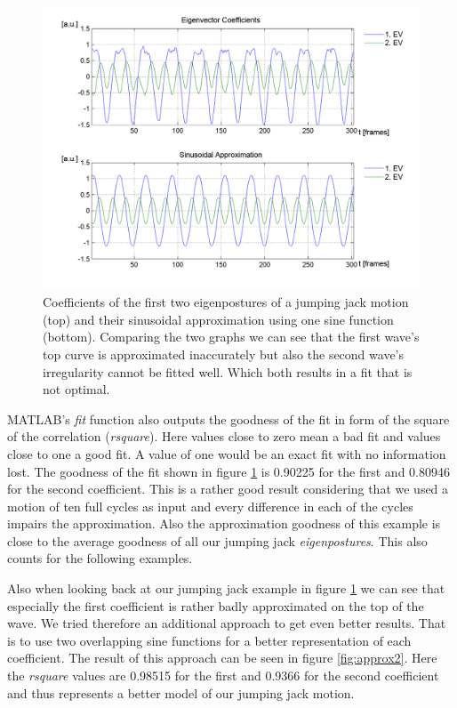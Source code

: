 \documentclass[a4paper]{article}
\begin{document}
\begin{figure}
		\centering
		\includegraphics[width=\textwidth]{1sinHamp.png}
		\caption{Coefficients of the first two eigenpostures of a jumping jack motion (top) and their sinusoidal approximation using one sine function (bottom).
		Comparing the two graphs we can see that the first wave's top curve is approximated inaccurately but also the second wave's irregularity cannot be fitted well.
		Which both results in a fit that is not optimal.}
		\label{fig:approx}
\end{figure}

MATLAB's \emph{fit} function also outputs the goodness of the fit in form of the square of the correlation (\emph{rsquare}).
Here values close to zero mean a bad fit and values close to one a good fit.
A value of one would be an exact fit with no information lost.
The goodness of the fit shown in figure \ref{fig:approx} is 0.90225 for the first and 0.80946 for the second coefficient.
This is a rather good result considering that we used a motion of ten full cycles as input and every difference in each of the cycles impairs the approximation.
Also the approximation goodness of this example is close to the average goodness of all our jumping jack \emph{eigenpostures}.
This also counts for the following examples.

Also when looking back at our jumping jack example in figure \ref{fig:approx} we can see that especially the first coefficient is rather badly approximated on the top of the wave.
We tried therefore an additional approach to get even better results. That is to use two overlapping sine functions for a better representation of each coefficient.
The result of this approach can be seen in figure \ref{fig:approx2}.
Here the \emph{rsquare} values are 0.98515 for the first and 0.9366 for the second coefficient and thus represents a better model of our jumping jack motion.
\end{document}
